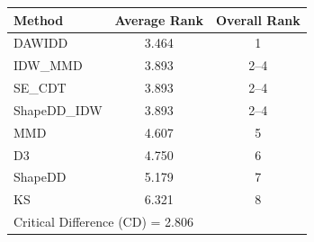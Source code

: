 \begin{tabular}{|l|c|c|}
\hline
\textbf{Method} & \textbf{Average Rank} & \textbf{Overall Rank} \\
\hline
DAWIDD & 3.464 & 1 \\
IDW\_MMD & 3.893 & 2--4 \\
SE\_CDT & 3.893 & 2--4 \\
ShapeDD\_IDW & 3.893 & 2--4 \\
MMD & 4.607 & 5 \\
D3 & 4.750 & 6 \\
ShapeDD & 5.179 & 7 \\
KS & 6.321 & 8 \\
\hline
\multicolumn{3}{|l|}{Critical Difference (CD) = 2.806} \\
\hline
\end{tabular}

